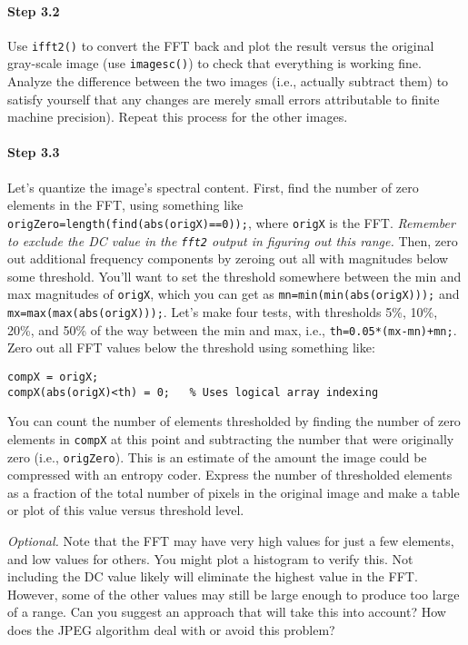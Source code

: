 \paragraph{Step 3.2} Use \verb|ifft2()| to convert the FFT back and
plot the result versus the original gray-scale image (use
\verb|imagesc()|) to check that everything is working fine. Analyze
the difference between the two images (i.e., actually subtract them)
to satisfy yourself that any changes are merely small errors
attributable to finite machine precision). Repeat this process for the
other images.

\paragraph{Step 3.3} Let's quantize the image's spectral
content. First, find the number of zero elements in the FFT, using
something like \verb|origZero=length(find(abs(origX)==0));|, where
\verb|origX| is the FFT. \emph{Remember to exclude the DC value in the
  \texttt{fft2} output in figuring out this range.} Then, zero out
additional frequency components by zeroing out all with magnitudes
below some threshold. You'll want to set the threshold somewhere
between the min and max magnitudes of \verb|origX|, which you can get as
\verb|mn=min(min(abs(origX)));| and \verb|mx=max(max(abs(origX)));|. Let's
make four tests, with thresholds 5\%, 10\%, 20\%, and 50\% of the way
between the min and max, i.e., \verb|th=0.05*(mx-mn)+mn;|. Zero out
all FFT values below the threshold using something like:
\begin{lstlisting}[style=Matlab-editor,basicstyle=\mlttfamily\small]
compX = origX;
compX(abs(origX)<th) = 0;   % Uses logical array indexing
\end{lstlisting}
You can count the number of elements thresholded by finding the number
of zero elements in \verb|compX| at this point and subtracting the number
that were originally zero (i.e., \verb|origZero|). This is an estimate
of the amount the image could be compressed with an entropy
coder. Express the number of thresholded elements as a fraction of the
total number of pixels in the original image and make a table or plot
of this value versus threshold level.

\textit{Optional.} Note that the FFT may have very high values for
just a few elements, and low values for others. You might plot a
histogram to verify this. Not including the DC value likely will
eliminate the highest value in the FFT. However, some of the other
values may still be large enough to produce too large of a range. Can
you suggest an approach that will take this into account? How does the
JPEG algorithm deal with or avoid this problem?

